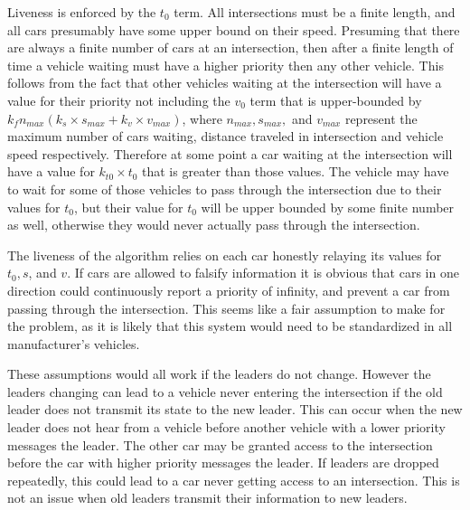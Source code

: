 \documentclass[12pt]{article}
\begin{document}
Liveness is enforced by the $t_0$ term. All intersections must be a finite length, and all cars presumably have some upper bound on their speed. Presuming that there are always a finite number of cars at an intersection, then after a finite length of time a vehicle waiting must have a higher priority then any other vehicle. This follows from the fact that other vehicles waiting at the intersection will have a value for their priority not including the $v_0$ term that is upper-bounded by $k_fn_{max}(k_s \times s_{max} + k_v \times v_{max})$, where $n_{max}, s_{max},$ and $v_{max}$ represent the maximum number of cars waiting, distance traveled in intersection and vehicle speed respectively. Therefore at some point a car waiting at the intersection will have a value for $k_{t0} \times t_0$ that is greater than those values. The vehicle may have to wait for some of those vehicles to pass through the intersection due to their values for $t_0$, but their value for $t_0$ will be upper bounded by some finite number as well, otherwise they would never actually pass through the intersection.\par
The liveness of the algorithm relies on each car honestly relaying its values for $t_0, s$, and $v$. If cars are allowed to falsify information it is obvious that cars in one direction could continuously report a priority of infinity, and prevent a car from passing through the intersection. This seems like a fair assumption to make for the problem, as it is likely that this system would need to be standardized in all manufacturer's vehicles. \par
These assumptions would all work if the leaders do not change. However the leaders changing can lead to a vehicle never entering the intersection if the old leader does not transmit its state to the new leader. This can occur when the new leader does not hear from a vehicle before another vehicle with a lower priority messages the leader. The other car may be granted access to the intersection before the car with higher priority messages the leader. If leaders are dropped repeatedly, this could lead to a car never getting access to an intersection. This is not an issue when old leaders transmit their information to new leaders.
\end{document}
